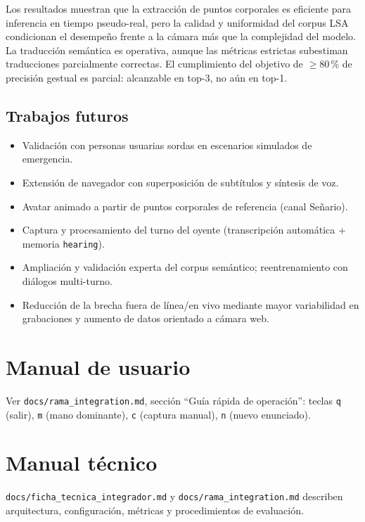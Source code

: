 \documentclass[12pt,a4paper]{report}
\begin{document}
Los resultados muestran que la extracción de puntos corporales es eficiente para inferencia en tiempo pseudo-real, pero la calidad y uniformidad del corpus LSA condicionan el desempeño frente a la cámara más que la complejidad del modelo. La traducción semántica es operativa, aunque las métricas estrictas subestiman traducciones parcialmente correctas. El cumplimiento del objetivo de $\geq$80\,\% de precisión gestual es parcial: alcanzable en top-3, no aún en top-1.

\section{Trabajos futuros}
\begin{itemize}
    \item Validación con personas usuarias sordas en escenarios simulados de emergencia.
    \item Extensión de navegador con superposición de subtítulos y síntesis de voz.
    \item Avatar animado a partir de puntos corporales de referencia (canal Señario).
    \item Captura y procesamiento del turno del oyente (transcripción automática + memoria \texttt{hearing}).
    \item Ampliación y validación experta del corpus semántico; reentrenamiento con diálogos multi-turno.
    \item Reducción de la brecha fuera de línea/en vivo mediante mayor variabilidad en grabaciones y aumento de datos orientado a cámara web.
\end{itemize}

\printbibliography[title={Referencias}]

\appendix
\chapter{Manual de usuario}
Ver \texttt{docs/rama\_integration.md}, sección ``Guía rápida de operación'': teclas \texttt{q} (salir), \texttt{m} (mano dominante), \texttt{c} (captura manual), \texttt{n} (nuevo enunciado).

\chapter{Manual técnico}
\texttt{docs/ficha\_tecnica\_integrador.md} y \texttt{docs/rama\_integration.md} describen arquitectura, configuración, métricas y procedimientos de evaluación.
\end{document}
